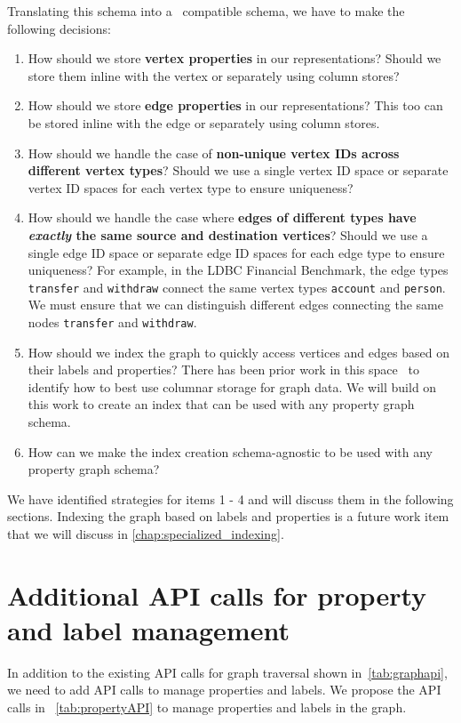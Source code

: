 Translating this schema into a~\project{} compatible schema, we have to make the following decisions:
\begin{enumerate}
  \item How should we store \textbf{vertex properties} in our representations? Should we store them inline with the vertex or separately using column stores?
  \item How should we store \textbf{edge properties} in our representations? This too can be stored inline with the edge or separately using column stores.
  \item How should we handle the case of \textbf{non-unique vertex IDs across different vertex types}? Should we use a single vertex ID space or separate vertex ID spaces for each vertex type to ensure uniqueness?
  \item How should we handle the case where \textbf{edges of different types have \emph{exactly} the same source and destination vertices}? Should we use a single edge ID space or separate edge ID spaces for each edge type to ensure uniqueness? For example, in the LDBC Financial Benchmark, the edge types \texttt{transfer} and \texttt{withdraw} connect the same vertex types \texttt{account} and \texttt{person}. We must ensure that we can distinguish different edges connecting the same nodes \texttt{transfer} and \texttt{withdraw}.
  \item How should we index the graph to quickly access vertices and edges based on their labels and properties? There has been prior work in this space~\cite{graphflowdb2021Gupta} to identify how to best use columnar storage for graph data. We will build on this work to create an index that can be used with any property graph schema.
  \item How can we make the index creation schema-agnostic to be used with any property graph schema?
\end{enumerate}

We have identified strategies for items 1 - 4 and will discuss them in the following sections. Indexing the graph based on labels and properties is a future work item that we will discuss in \autoref{chap:specialized_indexing}.

\section{Additional API calls for property and label management}
In addition to the existing API calls for graph traversal shown in~\autoref{tab:graphapi}, we need to add API calls to manage properties and labels.
We propose the API calls in ~\autoref{tab:propertyAPI} to manage properties and labels in the graph.

